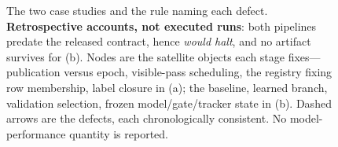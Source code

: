 \begin{figure}[!t]
{}
\caption{The two case studies and the rule naming each defect. \textbf{Retrospective accounts,
not executed runs}: both pipelines predate the released contract, hence \emph{would halt}, and no
artifact survives for (b). Nodes are the satellite objects each stage fixes---publication versus
epoch, visible-pass scheduling, the registry fixing row membership, label closure in (a); the
baseline, learned branch, validation selection, frozen model/gate/tracker state in (b). Dashed
arrows are the defects, each chronologically consistent. No model-performance quantity is reported.}
\label{fig:cases}
\end{figure}
